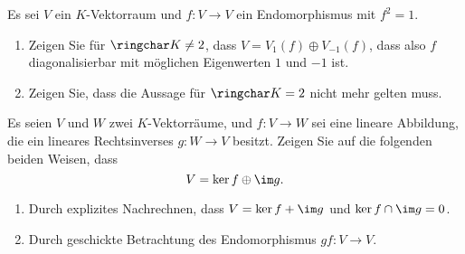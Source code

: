 \begin{question}
  Es sei $V$ ein $K$-Vektorraum und $f \colon V \to V$ ein Endomorphismus mit $f^2 = 1$.
  \begin{enumerate}[leftmargin=*]
    \item
      Zeigen Sie für $\ringchar K \neq 2$, dass $V = V_1(f) \oplus V_{-1}(f)$, dass also $f$ diagonalisierbar mit möglichen Eigenwerten $1$ und $-1$ ist.
    \item
      Zeigen Sie, dass die Aussage für $\ringchar K = 2$ nicht mehr gelten muss.
  \end{enumerate}
\end{question}


\begin{question}
  Es seien $V$ und $W$ zwei $K$-Vektorräume, und $f \colon V \to W$ sei eine lineare Abbildung, die ein lineares Rechtsinverses $g \colon W \to V$ besitzt.
  Zeigen Sie auf die folgenden beiden Weisen, dass
  \[
    V = \ker f \oplus \im g.
  \]
  \begin{enumerate}[leftmargin=*]
    \item
      Durch explizites Nachrechnen, dass $V = \ker f + \im g$ und $\ker f \cap \im g = 0$.
    \item
      Durch geschickte Betrachtung des Endomorphismus $gf \colon V \to V$.
  \end{enumerate}
\end{question}


